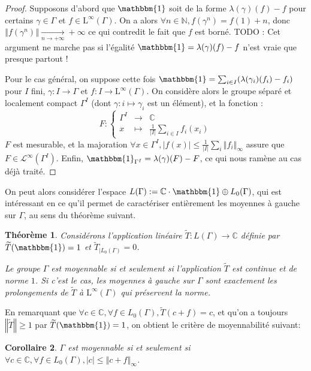 \documentclass[a4paper,12pt]{article}
\newtheorem{theorem}{Théorème}[section]
\newtheorem{corollary}[theorem]{Corollaire}
\newcommand{\N}{\mathbb{N}}
\newcommand{\C}{\mathbb{C}}
\newcommand{\norm}[1]{\left\Vert #1\right\Vert}
\newcommand{\abs}[1]{\left\vert#1\right\vert}
\newcommand{\card}[1]{\abs{#1}}
\newcommand{\indic}{\mathbbm{1}}
\newcommand\fundef[3]{#1: \left\{\begin{array}{ccc}#2\\#3\end{array}\right.}
\newcommand{\ssi}{si et seulement si }
\newcommand{\TODO}[1]{{\color{red}TODO :} #1}
\begin{document}
\begin{proof}
    Supposons d'abord que $\indic$ soit de la forme $\lambda(\gamma)(f) - f$ pour certains $\gamma\in\Gamma$ et 
    $f\in\mathrm{L}^\infty(\Gamma)$. On a alors $\forall n\in\N, f(\gamma^n) = f(1) + n$, donc $\norm{f(\gamma^n)}\xrightarrow[n\to+\infty]{}+\infty$
    ce qui contredit le fait que $f$ est borné. \TODO{Cet argument ne marche pas si l'égalité $\indic = \lambda(\gamma)(f) - f$ n'est 
    vraie que presque partout !}

    Pour le cas général, on suppose cette fois $\indic = \sum_{i\in I} (\lambda(\gamma_i)(f_i) - f_i)$ pour $I$ fini, $\gamma : I \to\Gamma$ et
    $f : I\to\mathrm{L}^\infty(\Gamma)$. On considère alors le groupe séparé et localement compact $\Gamma^I$ (dont $\gamma : i\mapsto \gamma_i$ est
    un élément), et la fonction : 
    \begin{equation*}
        \fundef{F}{\Gamma^I&\to&\C}{x&\mapsto&\frac{1}{\card{I}}\sum_{i\in I}f_i(x_i)}
    \end{equation*}
    $F$ est mesurable, et la majoration
    $\forall x\in\Gamma^I, \abs{f(x)}\le\frac1{\card{I}}\sum_i\norm{f_i}_\infty$ assure que $F\in\mathscr{L}^\infty(\Gamma^I)$. 
    Enfin, $\indic_{\Gamma^I} = \lambda(\gamma)(F) - F$, ce qui nous ramène au cas déjà traité. 
\end{proof}

On peut alors considérer l'espace $L(\Gamma) := \C\cdot\indic \oplus L_0(\Gamma)$, qui est intéressant en ce qu'il permet de caractériser entièrement
les moyennes à gauche sur $\Gamma$, au sens du théorème suivant.

\begin{theorem}\label{left_mean_iff}
    Considérons l'application linéaire $\widetilde{T} : L(\Gamma)\to\C$ définie par $\widetilde{T}(\indic) = 1$
    et $\widetilde{T}_{|L_0(\Gamma)} = 0$. 
    
    Le groupe $\Gamma$ est moyennable \ssi l'application $\widetilde{T}$ est continue et de norme $1$.
    Si c'est le cas, les moyennes à gauche sur $\Gamma$ sont exactement les prolongements de $\widetilde{T}$ à 
    $\mathrm{L}^\infty(\Gamma)$ qui préservent la norme.
\end{theorem}

En remarquant que $\forall c\in\C, \forall f\in L_0(\Gamma), \widetilde{T}(c + f) = c$, et qu'on a toujours 
$\norm{\widetilde{T}}\ge1$ par $\widetilde{T}(\indic) = 1$, on obtient le critère de moyennabilité suivant:

\begin{corollary}\label{amenable_iff_L0}
    $\Gamma$ est moyennable \ssi $\forall c\in\C, \forall f\in L_0(\Gamma), \abs{c}\le\norm{c + f}_\infty$.
\end{corollary}
\end{document}
